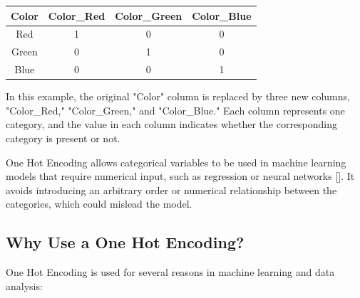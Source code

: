 \begin{center}
	\begin{tabular}{|c|c|c|c|}
		\hline
		Color & Color\_Red & Color\_Green & Color\_Blue \\
		\hline
		Red   & 1         & 0            & 0           \\
		Green & 0         & 1            & 0           \\
		Blue  & 0         & 0            & 1           \\
		\hline
	\end{tabular}
\end{center}

In this example, the original "Color" column is replaced by three new columns, "Color\_Red," "Color\_Green," and "Color\_Blue." Each column represents one category, and the value in each column indicates whether the corresponding category is present or not.

One Hot Encoding allows categorical variables to be used in machine learning models that require numerical input, such as regression or neural networks [\cite{Jie:2019}]. It avoids introducing an arbitrary order or numerical relationship between the categories, which could mislead the model.

\subsection{Why Use a One Hot Encoding?}

One Hot Encoding is used for several reasons in machine learning and data analysis:

